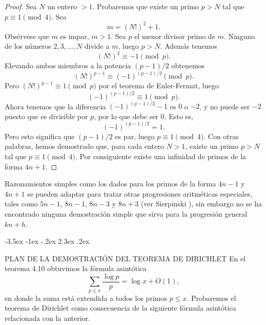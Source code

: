 \documentclass[12pt,a4paper]{book}
\makeatletter
\renewcommand\section{\@startsection{section}{1}{\z@}%
  {-3.5ex \@plus -1ex \@minus -.2ex}%
  {2.3ex \@plus .2ex}%
  {\normalfont\Large\bfseries\raggedright}}
\makeatother
\begin{document}
    \begin{proof}
        Sea $N$ un entero $>1$. Probaremos que existe un primo $p>N$ tal que
        $p\equiv1\pmod{4}$. Sea
        \begin{equation*}
            m=(N!)^{2}+1.
        \end{equation*}
        Obsérvese que $m$ es impar, $m>1$. Sea $p$ el menor divisor primo de $m$. Ninguno
        de los números $2,3,\dots,N$ divide a $m$, luego $p>N$. Además tenemos
        \begin{equation*}
            (N!)^{2}\equiv-1\pmod{p}.
        \end{equation*}
        Elevando ambos miembros a la potencia $(p-1)/2$ obtenemos
        \begin{equation*}
            (N!)^{p-1}\equiv(-1)^{(p-1)/2}\pmod{p}.
        \end{equation*}
        Pero $(N!)^{p-1}\equiv1\pmod{p}$ por el teorema de Euler-Fermat, luego
        \begin{equation*}
            (-1)^{(p-1)/2}\equiv1\pmod{p}.
        \end{equation*}
        Ahora tenemos que la diferencia $(-1)^{(p-1)/2}-1$ es $0$ o $-2$, y no puede ser
        $-2$ puesto que es divisible por $p$, por lo que debe ser $0$. Esto es,
        \begin{equation*}
            (-1)^{(p-1)/2}=1.
        \end{equation*}
        Pero esto significa que $(p-1)/2$ es par, luego $p\equiv1\pmod{4}$. Con otras
        palabras, hemos demostrado que, para cada entero $N>1$, existe un primo $p>N$ tal
        que $p\equiv1\pmod{4}$. Por consiguiente existe una infinidad de primos de la
        forma $4n+1$.
    \end{proof}

    Razonamientos simples como los dados para los primos de la forma $4n-1$ y $4n+1$ se
    pueden adaptar para tratar otras progresiones aritméticas especiales, tales como
    $5n-1$, $8n-1$, $8n-3$ y $8n+3$ (ver Sierpinski \cite{sierpinski1964}), sin embargo no se ha encontrado
    ninguna demostración simple que sirva para la progresión general $kn+h$.

    \section{PLAN DE LA DEMOSTRACIÓN DEL TEOREMA DE DIRICHLET}
    En el teorema 4.10 obtuvimos la fórmula asintótica
    \begin{equation}\label{eq:7-2}
        \sum_{p\leq x}\frac{\log p}{p}=\log x+O(1),
    \end{equation}
    en donde la suma está extendida a todos los primos $p\leq x$. Probaremos el teorema de
    Dirichlet como consecuencia de la siguiente fórmula asintótica relacionada con la
    anterior.
\end{document}
